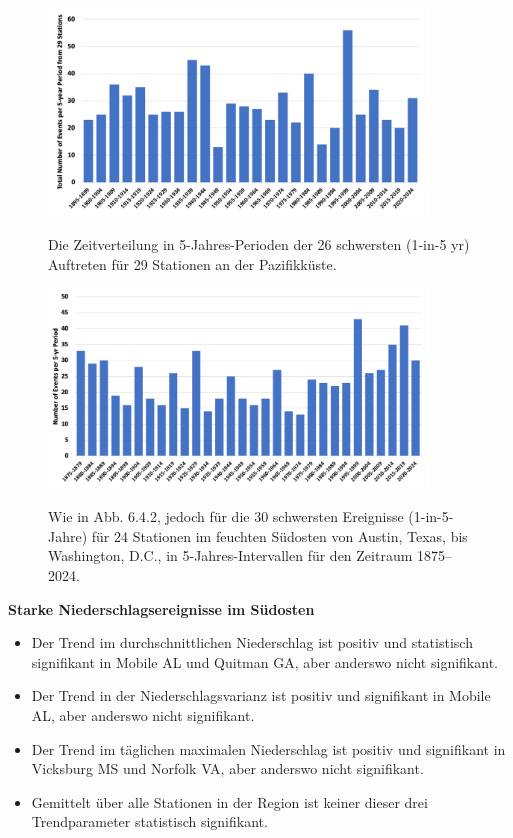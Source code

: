 \documentclass[12pt,paper=a4,DIV=12,parskip=never,chapterprefix=false,headings=standardclasses]{scrreprt}
\begin{document}
\begin{figure}[H]
\begin{center}
\includegraphics[width=0.9\textwidth]{bilder/bilderKlima-0056.png}\\[1cm]
\end{center}
\caption{Die Zeitverteilung in 5-Jahres-Perioden der 26 schwersten (1-in-5 yr) Auftreten für 29 Stationen an der Pazifikküste.}
\end{figure}
\begin{figure}[H]
\begin{center}
\includegraphics[width=0.9\textwidth]{bilder/bilderKlima-0057.png}\\[1cm]
\end{center}
\caption{Wie in Abb. 6.4.2, jedoch für die 30 schwersten Ereignisse (1-in-5-Jahre) für 24 Stationen im feuchten
Südosten von Austin, Texas, bis Washington, D.C., in 5-Jahres-Intervallen für den Zeitraum 1875–2024.}
\end{figure}

\textbf{Starke Niederschlagsereignisse im Südosten}
\begin{itemize}
\item Der Trend im durchschnittlichen Niederschlag ist positiv und statistisch signifikant in Mobile AL und Quitman GA, aber anderswo nicht signifikant. 
\item Der Trend in der Niederschlagsvarianz ist positiv und signifikant in Mobile AL, aber anderswo nicht signifikant.
\item Der Trend im täglichen maximalen Niederschlag ist positiv und signifikant in Vicksburg MS und Norfolk VA, aber anderswo nicht signifikant.
\item Gemittelt über alle Stationen in der Region ist keiner dieser drei Trendparameter statistisch signifikant. 
\end{itemize}
\end{document}
